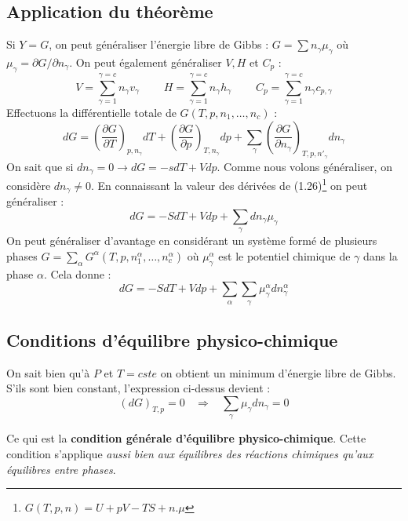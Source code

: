 \documentclass[british,french,11pt, a4paper, openany]{book}
\begin{document}
	\subsection{Application du théorème}
	Si $Y = G$, on peut généraliser l'énergie libre de Gibbs : $G = \sum n_\gamma \mu_\gamma$ où $\mu_\gamma = \partial G / \partial n_\gamma$. On peut également généraliser $V, H$ et $C_p$ :
	\begin{equation}
	V = \sum_{\gamma = 1}^{\gamma = c} n_\gamma v_\gamma\ \ \ \ \ \ \ \ \ \ 
	H = \sum_{\gamma = 1}^{\gamma = c} n_\gamma h_\gamma\ \ \ \ \ \ \ \ \ \ 
	C_p = \sum_{\gamma = 1}^{\gamma = c} n_\gamma c_{p,\gamma}
	\end{equation}
	Effectuons la différentielle totale de $G(T, p, n_1,\dots, n_c)$ :
	\begin{equation}
	dG = \left( \frac{\partial G}{\partial T} \right)_{p,n_\gamma} dT + \left( \frac{\partial G}{\partial p} \right)_{T,n_\gamma} dp + \sum_\gamma \left( \frac{\partial G}{\partial n_\gamma} \right)_{T, p, n'_\gamma} dn_\gamma
	\end{equation}
	On sait que si $dn_\gamma = 0 \rightarrow dG = -sdT + Vdp$. Comme nous volons généraliser, on considère $dn_\gamma \neq 0$. En connaissant la valeur des dérivées de (1.26)\footnote{$G(T,p,n) = U + pV - TS + n.\mu$} on peut généraliser :
	\begin{equation}
	dG = -S dT + V dp + \sum_\gamma dn_\gamma \mu_\gamma
	\end{equation}
	On peut généraliser d'avantage en considérant un système formé de plusieurs phases $G = \sum_\alpha G^\alpha(T, p, n_1^\alpha, \dots, n_c^\alpha)$ où $\mu_\gamma^\alpha$ est le potentiel chimique de $\gamma$ dans la phase $\alpha$. Cela donne :
	\begin{equation}
	dG = -SdT + Vdp + \sum_\alpha \sum_\gamma \mu_\gamma^\alpha dn_\gamma^\alpha
	\end{equation}
	
	\subsection{Conditions d'équilibre physico-chimique}
	On sait bien qu'à $P$ et $T = cste$ on obtient un minimum d'énergie libre de Gibbs. S'ils sont bien constant, l'expression ci-dessus devient :
	\begin{equation}
	(dG)_{T, p} = 0 \ \ \ \ \Rightarrow\ \ \ \ \sum_\gamma \mu_\gamma dn_\gamma = 0
	\end{equation}
	
	Ce qui est la \textbf{condition générale d'équilibre physico-chimique}. Cette condition s'applique \textit{aussi bien aux équilibres des réactions chimiques qu'aux équilibres entre phases}.\\
	
\end{document}
